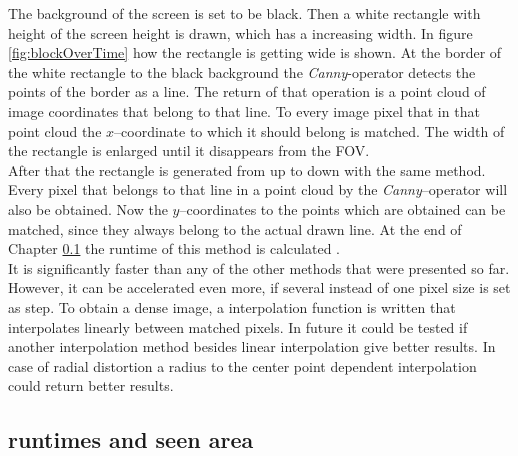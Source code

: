 \documentclass[journal,final,a4paper,twoside]{PS}
\begin{document}
The background of the screen is set to be black. Then a white rectangle with height of the screen height is drawn, which has a increasing width. In figure \ref{fig:blockOverTime} how the rectangle is getting wide is shown. At the border of the white rectangle to the black background the \emph{Canny}-operator detects the points of the border as a line. The return of that operation is a point cloud of image coordinates that belong to that line. To every image pixel that in that point cloud the $x$--coordinate to which it should belong is matched. The width of the rectangle is enlarged until it disappears from the FOV.\\
After that the rectangle is generated from up to down with the same method. Every pixel that belongs to that line in a point cloud by the \emph{Canny}--operator will also be obtained. Now the $y$--coordinates to the points which are obtained can be matched, since they always belong to the actual drawn line. At the end of Chapter \ref{sec:runtime} the runtime of this method is calculated .\\
It is significantly faster than any of the other methods that were presented so far. However, it can be accelerated even more, if several instead of one pixel size is set as step. To obtain a dense image, a interpolation function is written that interpolates linearly between matched pixels. In future it could be tested if another interpolation method besides linear interpolation give better results. In case of radial distortion a radius to the center point dependent interpolation could return better results.\\

\subsection{runtimes and seen area}
\label{sec:runtime}
\end{document}
